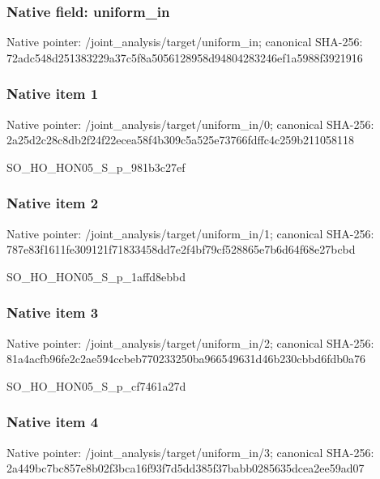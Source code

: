 \documentclass[10pt,a4paper]{article}
\begin{document}
\subsubsection{Native field: uniform\_\allowbreak{}in}
Native pointer: /joint\_\allowbreak{}analysis/target/uniform\_\allowbreak{}in; canonical SHA-256: 72adc548d251383229a37c5f8a5056128958d94804283246ef1a5988f3921916

\subsubsection{Native item 1}
Native pointer: /joint\_\allowbreak{}analysis/target/uniform\_\allowbreak{}in/0; canonical SHA-256: 2a25d2c28c8db2f24f22ecea58f4b309c5a525e73766fdffc4c259b211058118

\begingroup\raggedright\sloppy SO\_\allowbreak{}HO\_\allowbreak{}HON05\_\allowbreak{}S\_\allowbreak{}p\_\allowbreak{}981b3c27ef\par\endgroup

\subsubsection{Native item 2}
Native pointer: /joint\_\allowbreak{}analysis/target/uniform\_\allowbreak{}in/1; canonical SHA-256: 787e83f1611fe309121f71833458dd7e2f4bf79cf528865e7b6d64f68e27bcbd

\begingroup\raggedright\sloppy SO\_\allowbreak{}HO\_\allowbreak{}HON05\_\allowbreak{}S\_\allowbreak{}p\_\allowbreak{}1affd8ebbd\par\endgroup

\subsubsection{Native item 3}
Native pointer: /joint\_\allowbreak{}analysis/target/uniform\_\allowbreak{}in/2; canonical SHA-256: 81a4acfb96fe2c2ae594ccbeb770233250ba966549631d46b230cbbd6fdb0a76

\begingroup\raggedright\sloppy SO\_\allowbreak{}HO\_\allowbreak{}HON05\_\allowbreak{}S\_\allowbreak{}p\_\allowbreak{}cf7461a27d\par\endgroup

\subsubsection{Native item 4}
Native pointer: /joint\_\allowbreak{}analysis/target/uniform\_\allowbreak{}in/3; canonical SHA-256: 2a449bc7bc857e8b02f3bca16f93f7d5dd385f37babb0285635dcea2ee59ad07
\end{document}
